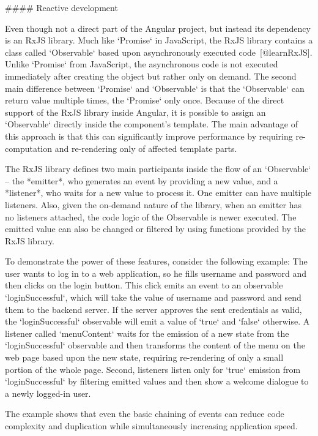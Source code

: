 \documentclass[
  digital, %
  oneside, %
  lof,     %
  nolot,     %
]{fithesis4}
\begin{document}
#### Reactive development

Even though not a direct part of the Angular project, but instead its dependency is an RxJS library. Much like `Promise` in JavaScript, the RxJS library contains a class called `Observable` based upon asynchronously executed code~[@learnRxJS]. Unlike `Promise` from JavaScript, the asynchronous code is not executed immediately after creating the object but rather only on demand. The second main difference between `Promise` and `Observable` is that the `Observable` can return value multiple times, the `Promise` only once. Because of the direct support of the RxJS library inside Angular, it is possible to assign an `Observable` directly inside the component's template. The main advantage of this approach is that this can significantly improve performance by requiring re-computation and re-rendering only of affected template parts.

The RxJS library defines two main participants inside the flow of an `Observable` -- the *emitter*, who generates an event by providing a new value, and a *listener*, who waits for a new value to process it. One emitter can have multiple listeners. Also, given the on-demand nature of the library, when an emitter has no listeners attached, the code logic of the Observable is newer executed. The emitted value can also be changed or filtered by using functions provided by the RxJS library.

To demonstrate the power of these features, consider the following example: The user wants to log in to a web application, so he fills username and password and then clicks on the login button. This click emits an event to an observable `loginSuccessful`, which will take the value of username and password and send them to the backend server. If the server approves the sent credentials as valid, the `loginSuccessful` observable will emit a value of `true` and `false` otherwise. A listener called `menuContent` waits for the emission of a new state from the `loginSuccessful` observable and then transforms the content of the menu on the web page based upon the new state, requiring re-rendering of only a small portion of the whole page. Second, listeners listen only for `true` emission from `loginSuccessful` by filtering emitted values and then show a welcome dialogue to a newly logged-in user.

The example shows that even the basic chaining of events can reduce code complexity and duplication while simultaneously increasing application speed.
\end{document}
